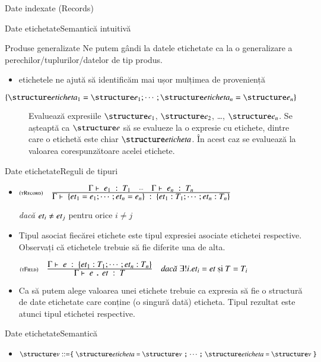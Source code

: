 \documentclass[xcolor=pdftex,romanian,colorlinks]{beamer}
\begin{document}
\begin{section}{Date indexate (Records)}
\begin{frame}{Date etichetate}{Semantică intuitivă}

\begin{block}{Produse generalizate}
Ne putem gândi la datele etichetate ca la o generalizare a perechilor/tuplurilor/datelor de tip produs.
\begin{itemize}
\item etichetele ne ajută să identificăm mai ușor mulțimea de proveniență
\end{itemize}
\end{block}

\vfill
\begin{description}
\item[$\{\Eticheta_1 = \Exp_1;\cdots;\Eticheta_n=\Exp_n\}$] Evaluează  expresiile $\Exp_1$, $\Exp_2$, \ldots, $\Exp_n$. 
 Se așteaptă ca $\Exp$ să se evalueze la o expresie cu etichete, dintre care o etichetă este chiar $\Eticheta$. În acest caz se evaluează la valoarea corespunzătoare acelei etichete.
\end{description}
\end{frame}

\begin{frame}{Date etichetate}{Reguli de tipuri}
\begin{itemize}
\item[] 
$\reg[tRecord]{\tjud{\{{\it et}_1 = e_1;\cdots;{\it et}_n = e_n\}}{\{{\it et}_1 : T_1;\cdots;{\it et}_n : T_n\}}}{\tjud{e_1}{T_1}{}\si\cdots\si\tjud{e_n}{T_n}{}}{}$

\hfill {\it dacă } ${\it et}_i \neq {\it et}_j$ pentru orice $i\neq j$ 
\item[] Tipul asociat fiecărei etichete este tipul expresiei asociate etichetei respective.  Observați că etichetele trebuie să fie diferite una de alta.

\vitem[] $\reg[tField]{\tjud{e\terminal{.}{\it et}}{T}}{\tjud{e}{\{{\it et}_1 : T_1;\cdots;{\it et}_n : T_n\}}{}}{\exists! i.{\it et}_i={\it et} \mbox{ și } T=T_i}$

\item[] Ca să putem alege valoarea unei etichete trebuie ca expresia să fie o structură de date etichetate care conține (o singură dată) eticheta.  Tipul rezultat este atunci tipul etichetei respective.
\end{itemize}
\end{frame}

\begin{frame}{Date etichetate}{Semantică}
\begin{itemize}
\item[] 
$\Val \mathrel{::=} \terminal{\{} \Eticheta \terminal{=} \Val \terminal{;} \cdots \terminal{;} \Eticheta \terminal{=} \Val \terminal{\}}$


\end{itemize}
\end{frame}
\end{section}
\end{document}
